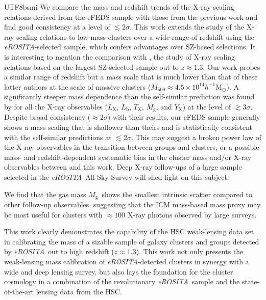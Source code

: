 \documentclass[longauth]{aa}
\newcommand{\Msunh}{\ensuremath{h^{-1}\mathrm{M}_{\odot}}}
\newcommand{\Mfiveoo}{\ensuremath{M_{500}}}
\newcommand{\redshift}{\ensuremath{z}}
\newcommand{\eROSITA}{\emph{eROSITA}}
\newcommand{\Lx}{\ensuremath{L_{\mathrm{X}}}}
\newcommand{\Lb}{\ensuremath{L_{\mathrm{b}}}}
\newcommand{\Tx}{\ensuremath{T_{\mathrm{X}}}}
\newcommand{\Yx}{\ensuremath{Y_{\mathrm{X}}}}
\newcommand{\Mg}{\ensuremath{M_{\mathrm{g}}}}
\begin{document}
\begin{CJK*}{UTF8}{bsmi}
We compare the mass and redshift trends of the X-ray scaling relations derived from the eFEDS sample with those from the previous work and find good consistency at a level of  $\lesssim2\sigma$.
This work extends the study of the X-ray scaling relations to low-mass clusters over a wide range of redshift using the \eROSITA-selected sample, which confers advantages over SZ-based selections.
It is interesting to mention the comparison with \cite{bulbul19}, the study of X-ray scaling relations based on the largest SZ-selected sample out to $\redshift\approx1.3$.
Our work probes a similar range of redshift but a mass scale that is much lower than that of these latter authors at the scale of massive clusters ($\Mfiveoo\approx4.5\times10^{14}\Msunh$).
A significantly steeper mass dependence than the self-similar prediction was found by \cite{bulbul19} for all the X-ray observables (\Lx, \Lb, \Tx, \Mg, and \Yx) at the level of $\gtrsim3\sigma$.
Despite broad consistency ($\approx2\sigma$) with their results, our eFEDS sample generally shows a mass scaling that is shallower than theirs and is statistically consistent with the self-similar predictions at $\lesssim2\sigma$. 
This may suggest a broken power law \citep{lebrun17} of the X-ray observables in the transition between groups and clusters, or a possible mass- and redshift-dependent systematic bias  in the cluster mass and/or X-ray observables between \cite{bulbul19} and this work.
Deep X-ray follow-ups of a large sample selected in the \eROSITA\ All-Sky Survey will shed light on this subject. 



We find that the gas mass \Mg\ shows the smallest intrinsic scatter compared to other follow-up observables, suggesting that the ICM mass-based mass proxy may be most useful for clusters with $\approx100$ X-ray photons observed by large surveys.



This work clearly demonstrates the capability of the HSC weak-lensing data set in calibrating the mass of a sizable sample of galaxy clusters and groups detected by \eROSITA\ out to high redshift ($\redshift\approx1.3$).
This work not only presents the weak-lensing mass calibration of \eROSITA-detected clusters in synergy with a wide and deep lensing survey, but also lays the foundation for the cluster cosmology in a combination of the revolutionary \eROSITA\ sample and the state-of-the-art lensing data from the HSC.



%
%


\end{CJK*}
\end{document}
